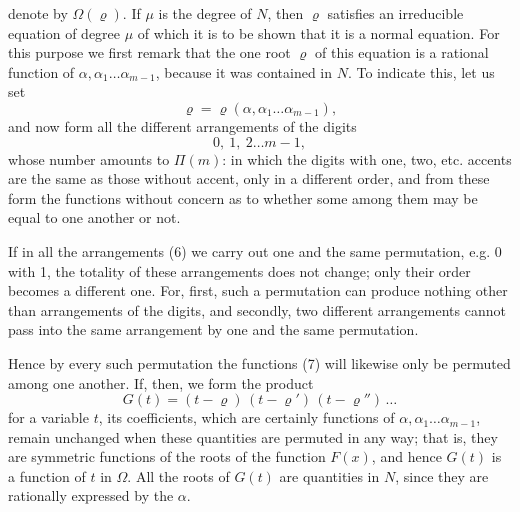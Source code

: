 
denote by $\Omega(\varrho)$. If $\mu$ is the degree of $N$, then $\varrho$ satisfies an irreducible equation of degree $\mu$
of which it is to be shown that it is a normal equation. For this purpose we first remark that the one root $\varrho$ of this equation is a rational function of $\alpha, \alpha_1 \ldots \alpha_{m-1}$, because it was contained in $N$. To indicate this, let us set
\[
\varrho = \varrho(\alpha, \alpha_1 \ldots \alpha_{m-1}),
\]
and now form all the different arrangements of the digits
\[
0,\ 1,\ 2 \ldots m - 1,
\]
whose number amounts to $\Pi(m)$:
in which the digits with one, two, etc. accents are the same as those without accent, only in a different order, and from these form the functions
without concern as to whether some among them may be equal to one another or not.

If in all the arrangements (6) we carry out one and the same permutation, e.g. 0 with 1, the totality of these arrangements does not change; only their order becomes a different one. For, first, such a permutation can produce nothing other than arrangements of the digits, and secondly, two different arrangements cannot pass into the same arrangement by one and the same permutation.

Hence by every such permutation the functions (7) will likewise only be permuted among one another. If, then, we form the product
\[
G(t) = (t - \varrho)\,(t - \varrho')\,(t - \varrho'')\,\ldots
\]
for a variable $t$, its coefficients, which are certainly functions of $\alpha, \alpha_1 \ldots \alpha_{m-1}$, remain unchanged when these quantities are permuted in any way; that is, they are symmetric functions of the roots of the function $F(x)$, and hence $G(t)$ is a function of $t$ in $\Omega$. All the roots of $G(t)$ are quantities in $N$, since they are rationally expressed by the $\alpha$.
